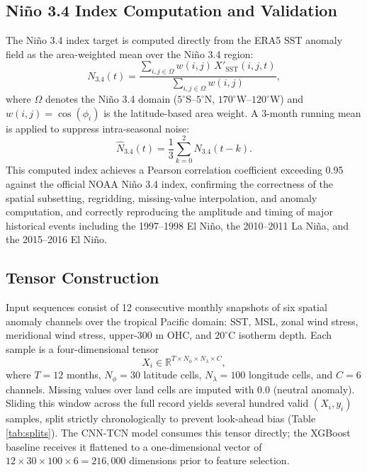 \documentclass[conference]{IEEEtran}
\begin{document}
\subsection{Ni\~no 3.4 Index Computation and Validation}
The Ni\~no 3.4 index target is computed directly from the ERA5 SST anomaly field as the area-weighted mean over the Ni\~no 3.4 region:
\begin{equation}
N_{3.4}(t) = \frac{\sum_{i,j \in \Omega} w(i,j)\, X'_{\mathrm{SST}}(i,j,t)}{\sum_{i,j \in \Omega} w(i,j)},
\label{eq:nino34}
\end{equation}
where $\Omega$ denotes the Ni\~no 3.4 domain ($5^{\circ}$S--$5^{\circ}$N, $170^{\circ}$W--$120^{\circ}$W) and $w(i,j)=\cos(\phi_i)$ is the latitude-based area weight. A 3-month running mean is applied to suppress intra-seasonal noise:
\begin{equation}
\hat{N}_{3.4}(t) = \frac{1}{3}\sum_{k=0}^{2} N_{3.4}(t-k).
\label{eq:oni}
\end{equation}
This computed index achieves a Pearson correlation coefficient exceeding 0.95 against the official NOAA Ni\~no 3.4 index, confirming the correctness of the spatial subsetting, regridding, missing-value interpolation, and anomaly computation, and correctly reproducing the amplitude and timing of major historical events including the 1997--1998 El Ni\~no, the 2010--2011 La Ni\~na, and the 2015--2016 El Ni\~no.

\subsection{Tensor Construction}
Input sequences consist of 12 consecutive monthly snapshots of six spatial anomaly channels over the tropical Pacific domain: SST, MSL, zonal wind stress, meridional wind stress, upper-300 m OHC, and $20^{\circ}$C isotherm depth. Each sample is a four-dimensional tensor
\begin{equation}
X_i \in \mathbb{R}^{T\times N_\phi\times N_\lambda\times C},
\label{eq:tensor}
\end{equation}
where $T=12$ months, $N_\phi=30$ latitude cells, $N_\lambda=100$ longitude cells, and $C=6$ channels. Missing values over land cells are imputed with 0.0 (neutral anomaly). Sliding this window across the full record yields several hundred valid $(X_i, y_i)$ samples, split strictly chronologically to prevent look-ahead bias (Table \ref{tab:splits}). The CNN-TCN model consumes this tensor directly; the XGBoost baseline receives it flattened to a one-dimensional vector of $12\times30\times100\times6=216{,}000$ dimensions prior to feature selection.
\end{document}
